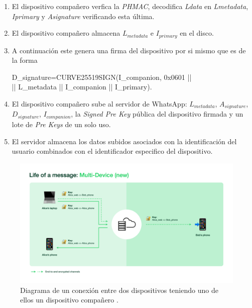 \begin{description}
\begin{enumerate}
		\item El dispositivo compañero  verfica la \emph{PHMAC}, decodifica \emph{Ldata} en \emph{Lmetadata}, \emph{Iprimary} y \emph{Asignature} verificando esta última.
		\item El dispositivo compañero almacena $L_{metadata}$ e $I_{primary}$ en el disco.
		\item A continuación este genera una firma del dispositivo por si mismo que es de la forma\\ 
		\begin{aligned}
			D_{signature}=CURVE25519\textunderscore SIGN(I_{companion}, 0x0601 || \\ || L_{metadata} || I_{companion} || I_{primary}).
		\end{aligned}
		\item El dispositivo compañero sube al servidor de WhatsApp: $L_{metadata}$, $A_{signature}$, $D_{signature}$, $I_{companion}$, la \emph{Signed Pre Key} pública del dispositivo firmada y un lote de \emph{Pre Keys} de un solo uso.
		\item El servidor almacena los datos subidos asociados con la identificación del usuario combinados con el identificador especifico del dispositivo.
	\end{enumerate}
\end{description}


\begin{figure}[htb]
	\centering
	\includegraphics[scale=0.25]{imagenes/what1.png} 
	\caption{Diagrama de un conexión entre dos dispositivos teniendo uno de ellos un dispositivo compañero \cite{what1}.}
	\label{what1}
\end{figure}

